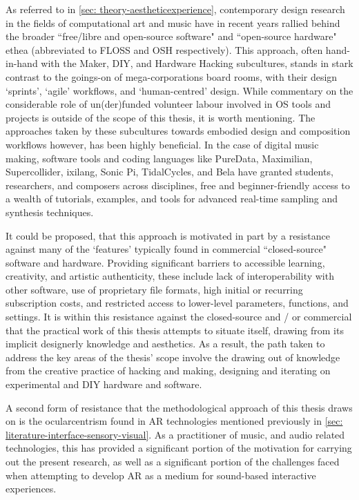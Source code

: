 As referred to in \autoref{sec: theory-aestheticexperience}, contemporary design research in the fields of computational art and music have in recent years rallied behind the broader ``free/libre and open-source software" and ``open-source hardware" ethea (abbreviated to FLOSS and OSH respectively). This approach, often hand-in-hand with the Maker, DIY, and Hardware Hacking subcultures, stands in stark contrast to the goings-on of mega-corporations board rooms, with their design `sprints', `agile' workflows, and `human-centred' design. While commentary on the considerable role of un(der)funded volunteer labour involved in OS tools and projects is outside of the scope of this thesis, it is worth mentioning. The approaches taken by these subcultures towards embodied design and composition workflows however, has been highly beneficial. In the case of digital music making, software tools and coding languages like PureData, Maximilian, Supercollider, ixilang, Sonic Pi, TidalCycles, and Bela have granted students, researchers, and composers across disciplines, free and beginner-friendly access to a wealth of tutorials, examples, and tools for advanced real-time sampling and synthesis techniques.

It could be proposed, that this approach is motivated in part by a resistance against many of the `features' typically found in commercial ``closed-source" software and hardware. Providing significant barriers to accessible learning, creativity, and artistic authenticity, these include lack of interoperability with other software, use of proprietary file formats, high initial or recurring subscription costs, and restricted access to lower-level parameters, functions, and settings. It is within this resistance against the closed-source and / or commercial that the practical work of this thesis attempts to situate itself, drawing from its implicit designerly knowledge and aesthetics. As a result, the path taken to address the key areas of the thesis' scope involve the drawing out of knowledge from the creative practice of hacking and making, designing and iterating on experimental and DIY hardware and software.

A second form of resistance that the methodological approach of this thesis draws on is the ocularcentrism found in AR technologies mentioned previously in \autoref{sec: literature-interface-sensory-visual}. As a practitioner of music, and audio related technologies, this has provided a significant portion of the motivation for carrying out the present research, as well as a significant portion of the challenges faced when attempting to develop AR as a medium for sound-based interactive experiences. %

